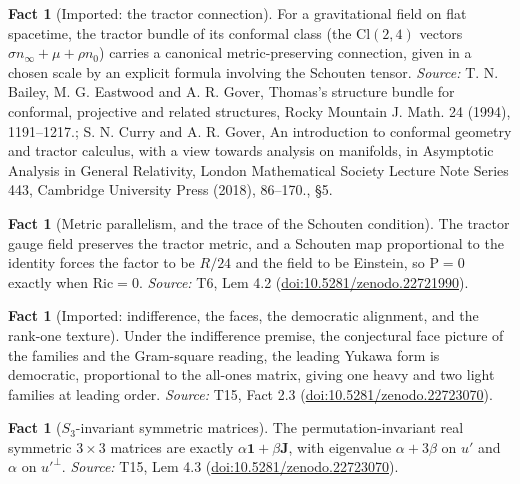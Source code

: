 \documentclass[11pt]{article}
\theoremstyle{definition}
\newtheorem{fact}[theorem]{Fact}
\theoremstyle{plain}
\providecommand{\Cl}{}\renewcommand{\Cl}{\mathrm{Cl}}
\providecommand{\J}{}\renewcommand{\J}{\mathbf{J}}
\providecommand{\Ric}{}\renewcommand{\Ric}{\mathrm{Ric}}
\providecommand{\Sch}{}\renewcommand{\Sch}{\mathrm{P}}
\providecommand{\nInf}{}\renewcommand{\nInf}{n_\infty}
\providecommand{\nO}{}\renewcommand{\nO}{n_0}
\begin{document}
\begin{fact}[Imported: the tractor connection]\label{c:interior.imported-tractor-connection}
For a gravitational field on flat spacetime, the tractor bundle of its conformal class (the $\Cl(2,4)$ vectors $\sigma\nInf + \mu + \rho\nO$) carries a canonical metric-preserving connection, given in a chosen scale by an explicit formula involving the Schouten tensor.
\emph{Source:} T. N. Bailey, M. G. Eastwood and A. R. Gover, Thomas's structure bundle for conformal, projective and related structures, Rocky Mountain J. Math. 24 (1994), 1191--1217.; S. N. Curry and A. R. Gover, An introduction to conformal geometry and tractor calculus, with a view towards analysis on manifolds, in Asymptotic Analysis in General Relativity, London Mathematical Society Lecture Note Series 443, Cambridge University Press (2018), 86--170., \S 5.
\end{fact}

\begin{fact}[Metric parallelism, and the trace of the Schouten condition]\label{c:interior.metric-parallelism-trace-schouten-condition}
The tractor gauge field preserves the tractor metric, and a Schouten map proportional to the identity forces the factor to be $R/24$ and the field to be Einstein, so $\Sch = 0$ exactly when $\Ric = 0$.
\emph{Source:} T6, Lem 4.2 (\href{https://doi.org/10.5281/zenodo.22721990}{doi:10.5281/zenodo.22721990}).
\end{fact}

\begin{fact}[Imported: indifference, the faces, the democratic alignment, and the rank-one texture]\label{c:neutrino.imported-indifference-faces-democratic-alignment-rank}
Under the indifference premise, the conjectural face picture of the families and the Gram-square reading, the leading Yukawa form is democratic, proportional to the all-ones matrix, giving one heavy and two light families at leading order.
\emph{Source:} T15, Fact 2.3 (\href{https://doi.org/10.5281/zenodo.22723070}{doi:10.5281/zenodo.22723070}).
\end{fact}

\begin{fact}[$S_{3}$-invariant symmetric matrices]\label{c:neutrino.invariant-symmetric-matrices}
The permutation-invariant real symmetric $3 \times 3$ matrices are exactly $\alpha\mathbf{1} + \beta\J$, with eigenvalue $\alpha + 3\beta$ on $u'$ and $\alpha$ on $u'^{\perp}$.
\emph{Source:} T15, Lem 4.3 (\href{https://doi.org/10.5281/zenodo.22723070}{doi:10.5281/zenodo.22723070}).
\end{fact}
\end{document}
